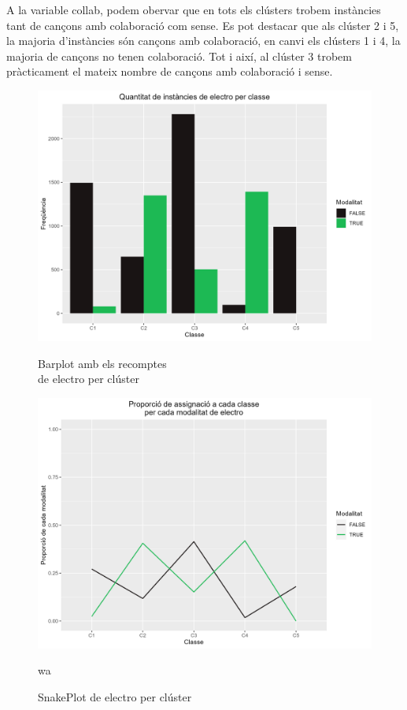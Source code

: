 \documentclass{article}
\begin{document}
A la variable collab, podem obervar que en tots els clústers trobem instàncies tant de cançons amb colaboració com sense. Es pot destacar que als clúster 2 i 5, la majoria d'instàncies són cançons amb colaboració, en canvi els clústers 1 i 4, la majoria de cançons no tenen colaboració. Tot i així, al clúster 3 trobem pràcticament el mateix nombre de cançons amb colaboració i sense.

\begin{figure}[H]
\centering
    \begin{minipage}{.49\textwidth}
        \centering
        \includegraphics[width=0.95\linewidth]{Images/5_Profiling/categoriques/cat/Cat_BarPlot_electro.png}
        \caption{Barplot amb els recomptes \\ de electro per clúster}
        \label{fig:Cat_BarPlot_electro}
    \end{minipage}%
    \begin{minipage}{.49\textwidth}
        \centering
        \includegraphics[width=0.95\linewidth]{Images/5_Profiling/categoriques/cat/Cat_SnakePlot_electro.png}
        \caption{SnakePlot de electro per clúster}
        \label{fig:Cat_SnakePlot_electro}
wa    \end{minipage}%
\end{figure}
\end{document}

